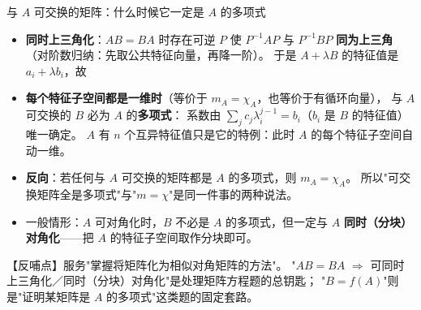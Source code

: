 \begin{fdeep}{与 $A$ 可交换的矩阵：什么时候它一定是 $A$ 的多项式}
\begin{itemize}[leftmargin=1.8em,itemsep=0.2em]
\item \textbf{同时上三角化}：$AB=BA$ 时存在可逆 $P$ 使 $P^{-1}AP$ 与 $P^{-1}BP$
      \textbf{同为上三角}（对阶数归纳：先取公共特征向量，再降一阶）。
      于是 $A+\lambda B$ 的特征值是 $a_i+\lambda b_i$，故
\item \textbf{每个特征子空间都是一维时}（等价于 $m_A=\chi_A$，也等价于有循环向量），
      与 $A$ 可交换的 $B$ 必为 $A$ 的\textbf{多项式}：
      系数由 $\sum_j c_j\lambda_i^{j-1}=b_i$（$b_i$ 是 $B$ 的特征值）唯一确定。
      $A$ 有 $n$ 个互异特征值只是它的特例：此时 $A$ 的每个特征子空间自动一维。
\item \textbf{反向}：若任何与 $A$ 可交换的矩阵都是 $A$ 的多项式，则 $m_A=\chi_A$。
      所以"可交换矩阵全是多项式"与"$m=\chi$"是同一件事的两种说法。
\item 一般情形：$A$ 可对角化时，$B$ 不必是 $A$ 的多项式，但一定与 $A$
      \textbf{同时（分块）对角化}——把 $A$ 的特征子空间取作分块即可。
\end{itemize}
【反哺点】服务"掌握将矩阵化为相似对角矩阵的方法"。
"$AB=BA$ $\Rightarrow$ 可同时上三角化／同时（分块）对角化"是处理矩阵方程题的总钥匙；
"$B=f(A)$"则是"证明某矩阵是 $A$ 的多项式"这类题的固定套路。
\end{fdeep}


